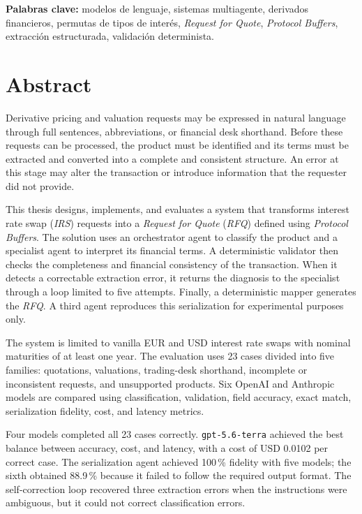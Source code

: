 \medskip

\noindent\textbf{Palabras clave:} modelos de lenguaje, sistemas multiagente, derivados financieros, permutas de tipos de interés, \textit{Request for Quote}, \textit{Protocol Buffers}, extracción estructurada, validación determinista.

\chapter*{Abstract}

Derivative pricing and valuation requests may be expressed in natural language through full sentences, abbreviations, or financial desk shorthand. Before these requests can be processed, the product must be identified and its terms must be extracted and converted into a complete and consistent structure. An error at this stage may alter the transaction or introduce information that the requester did not provide.

This thesis designs, implements, and evaluates a system that transforms interest rate swap (\textit{IRS}) requests into a \textit{Request for Quote} (\textit{RFQ}) defined using \textit{Protocol Buffers}. The solution uses an orchestrator agent to classify the product and a specialist agent to interpret its financial terms. A deterministic validator then checks the completeness and financial consistency of the transaction. When it detects a correctable extraction error, it returns the diagnosis to the specialist through a loop limited to five attempts. Finally, a deterministic mapper generates the \textit{RFQ}. A third agent reproduces this serialization for experimental purposes only.

The system is limited to vanilla EUR and USD interest rate swaps with nominal maturities of at least one year. The evaluation uses 23 cases divided into five families: quotations, valuations, trading-desk shorthand, incomplete or inconsistent requests, and unsupported products. Six OpenAI and Anthropic models are compared using classification, validation, field accuracy, exact match, serialization fidelity, cost, and latency metrics.

Four models completed all 23 cases correctly. \texttt{gpt-5.6-terra} achieved the best balance between accuracy, cost, and latency, with a cost of USD 0.0102 per correct case. The serialization agent achieved 100\,\% fidelity with five models; the sixth obtained 88.9\,\% because it failed to follow the required output format. The self-correction loop recovered three extraction errors when the instructions were ambiguous, but it could not correct classification errors.

